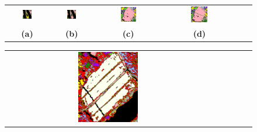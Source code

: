 \documentclass{siamart171218}
\begin{document}
\begin{figure} [H]
    \centering
    \begin{tabular}{cccccc}
        \includegraphics[width=0.25\textwidth]{images/island_RLRl1.png} &
        \includegraphics[width=0.25\textwidth]{images/island_RF.png} &
        \includegraphics[width=0.25\textwidth]{images/electric_line_RLR1.png} &
        \includegraphics[width=0.25\textwidth]{images/electric_line_RLRl2.png} \\
        \textbf{(a)}  & \textbf{(b)} & \textbf{(c)}  & \textbf{(d)} \\[6pt]
    \end{tabular}
    \begin{tabular}{cccccc}
        \includegraphics[width=0.3\textwidth]{images/field_RF.png} &

\end{tabular}
\end{figure}
\end{document}
